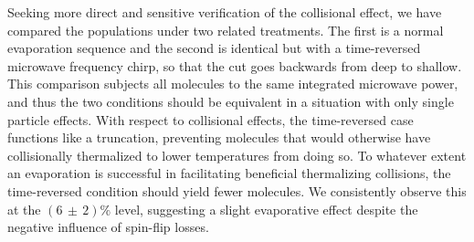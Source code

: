 \documentclass[%
 reprint,
 amsmath,amssymb,
 aps,
prl,
]{revtex4-1}
\begin{document}
Seeking more direct and sensitive verification of the collisional effect, we have compared the populations under two related treatments. 
The first is a normal evaporation sequence and the second is identical but with a time-reversed microwave frequency chirp, so that the cut goes backwards from deep to shallow.
This comparison subjects all molecules to the same integrated microwave power, and thus the two conditions should be equivalent in a situation with only single particle effects.
With respect to collisional effects, the time-reversed case functions like a truncation, preventing molecules that would otherwise have collisionally thermalized to lower temperatures from doing so.
To whatever extent an evaporation is successful in facilitating beneficial thermalizing collisions, the time-reversed condition should yield fewer molecules.
We consistently observe this at the $(6\,{\pm}\,2)\%$ level, suggesting a slight evaporative effect despite the negative influence of spin-flip losses.%
\end{document}
